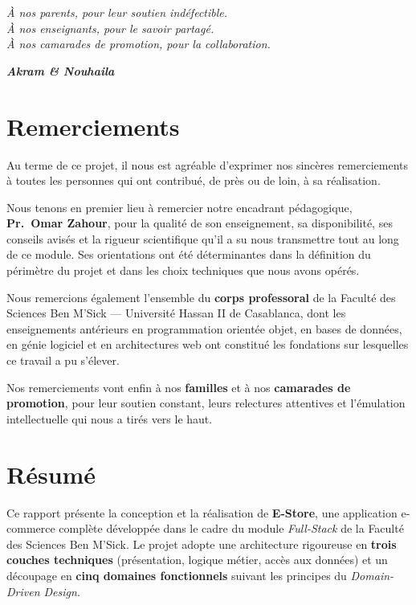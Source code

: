 \documentclass[11pt,a4paper,oneside]{report}
\begin{document}
\thispagestyle{empty}
\vspace*{2cm}
\begin{flushright}\itshape\large
À nos parents, pour leur soutien indéfectible.\\[0.4cm]
À nos enseignants, pour le savoir partagé.\\[0.4cm]
À nos camarades de promotion, pour la collaboration.\\[0.4cm]
\end{flushright}
\vfill
\begin{center}\itshape
\textbf{Akram \& Nouhaila}
\end{center}
\newpage

\thispagestyle{plain}
\chapter*{Remerciements}

Au terme de ce projet, il nous est agréable d'exprimer nos sincères
remerciements à toutes les personnes qui ont contribué, de près ou de loin,
à sa réalisation.

Nous tenons en premier lieu à remercier notre encadrant pédagogique,
\textbf{Pr.\ Omar Zahour}, pour la qualité de son enseignement, sa
disponibilité, ses conseils avisés et la rigueur scientifique qu'il a su
nous transmettre tout au long de ce module. Ses orientations ont été
déterminantes dans la définition du périmètre du projet et dans les choix
techniques que nous avons opérés.

Nous remercions également l'ensemble du \textbf{corps professoral} de la
Faculté des Sciences Ben M'Sick — Université Hassan II de Casablanca, dont
les enseignements antérieurs en programmation orientée objet, en bases de
données, en génie logiciel et en architectures web ont constitué les
fondations sur lesquelles ce travail a pu s'élever.

Nos remerciements vont enfin à nos \textbf{familles} et à nos
\textbf{camarades de promotion}, pour leur soutien constant, leurs
relectures attentives et l'émulation intellectuelle qui nous a tirés vers
le haut.

\chapter*{Résumé}

Ce rapport présente la conception et la réalisation de \textbf{E-Store},
une application e-commerce complète développée dans le cadre du module
\textit{Full-Stack} de la Faculté des Sciences Ben M'Sick. Le projet adopte
une architecture rigoureuse en \textbf{trois couches techniques}
(présentation, logique métier, accès aux données) et un découpage en
\textbf{cinq domaines fonctionnels} suivant les principes du
\textit{Domain-Driven Design}.
\end{document}
